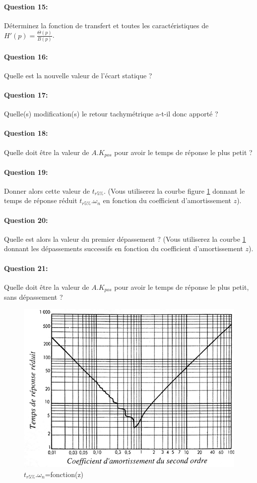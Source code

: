 \paragraph{Question 15:} Déterminez la fonction de transfert et toutes les caractéristiques de $H'(p)=\frac{\Theta(p)}{B(p)}$.

\paragraph{Question 16:} Quelle est la nouvelle valeur de l'écart statique ? 

\paragraph{Question 17:} Quelle(s) modification(s) le retour tachymétrique a-t-il donc apporté ?

\paragraph{Question 18:} Quelle doit être la valeur de $A.K_{pos}$ pour avoir le temps de réponse le plus petit ?

\paragraph{Question 19:} Donner alors cette valeur de $t_{r5\%}$. (Vous utiliserez la courbe figure \ref{phare5} donnant le temps de réponse réduit $t_{r5\%}.\omega_n$ en fonction du coefficient d'amortissement $z$).

\paragraph{Question 20:} Quelle est alors la valeur du premier dépassement ? (Vous utiliserez la courbe \ref{phare5} donnant les dépassements successifs en fonction du coefficient d'amortissement $z$).

\paragraph{Question 21:} Quelle doit être la valeur de $A.K_{pos}$ pour avoir le temps de réponse le plus petit, sans dépassement ?

\begin{figure}[!h]
  \centering
  \includegraphics[width=0.6\linewidth]{img/phare5}
  \caption{$t_{r5\%}.\omega_n$=fonction(z)}
  \label{phare5}
\end{figure}

